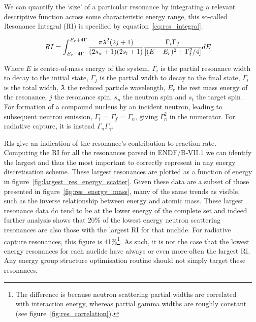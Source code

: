 
We can quantify the `size' of a particular resonance by integrating a relevant descriptive function across some characteristic energy range, this so-called Resonance Integral (RI) is specified by equation~\ref{eq:res_integral}. 

\begin{equation}
  \label{eq:res_integral}
  RI = \int_{E_{r}-4\Gamma}^{E_{r}+4\Gamma} \frac{\pi\lambdabar^{2}(2j + 1)}{(2s_{n} + 1)(2s_{t} + 1)}  \frac{\Gamma_{i}\Gamma_{f}}{[(E-E_{r})^{2} + \Gamma^{2}_{t}/4]} dE
\end{equation}

Where $E$ is centre-of-mass energy of the system, $\Gamma_{i}$ is the partial resonance width to decay to the initial state, $\Gamma_{f}$ is the partial width to decay to the final state, $\Gamma_{t}$ is the total width, $\lambdabar$ the reduced particle wavelength, $E_{r}$ the rest mass energy of the resonance, $j$ the resonance spin, $s_{n}$ the neutron spin and $s_{t}$ the target spin \cite{Libby2005}. For formation of a compound nucleus by an incident neutron, leading to subsequent neutron emission, $\Gamma_{i}$ = $\Gamma_{f}$ = $\Gamma_{n}$, giving $\Gamma^{2}_{n}$ in the numerator. For radiative capture, it is instead $\Gamma_{n}\Gamma_{\gamma}$. 

RIs give an indication of the resonance's contribution to reaction rate. Computing the RI for all the resonances parsed in ENDF/B-VII.1 we can identify the largest and thus the most important to correctly represent in any energy discretisation scheme. These largest resonances are plotted as a function of energy in figure~\ref{fig:largest_res_energy_scatter}. Given these data are a subset of those presented in figure~\ref{fig:res_energy_mass}, many of the same trends as visible, such as the inverse relationship between energy and atomic mass. These largest resonance data do tend to be at the lower energy of the complete set and indeed further analysis shows that 20\% of the lowest energy neutron scattering resonances are also those with the largest RI for that nuclide. For radiative capture resonances, this figure is 41\%\footnote{The difference is because neutron scattering partial widths are correlated with interaction energy, whereas partial gamma widths are roughly constant (see figure~\ref{fig:res_correlation}).}. As such, it is not the case that the lowest energy resonances for each nuclide have always or even more often the largest RI. Any energy group structure optimisation routine should not simply target these resonances.

